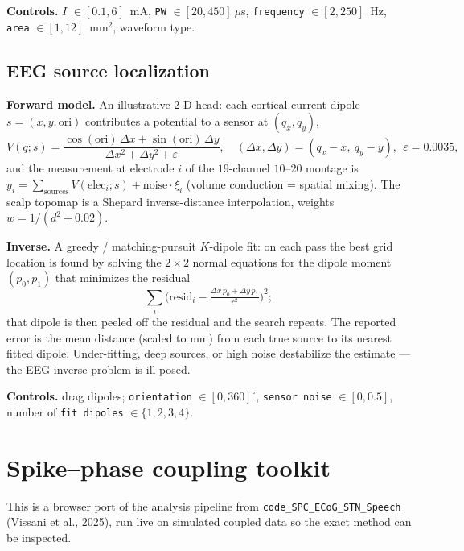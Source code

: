 \documentclass[11pt]{article}
\newcommand{\param}[1]{\textcolor{neonmag}{\texttt{#1}}}
\newcommand{\code}[1]{\texttt{#1}}
\begin{document}
\textbf{Controls.} \param{$I$} $\in[0.1,6]$~mA, \param{PW} $\in[20,450]~\mu$s,
\param{frequency} $\in[2,250]$~Hz, \param{area} $\in[1,12]$~mm$^2$, waveform type.

\subsection{EEG source localization}

\textbf{Forward model.} An illustrative 2-D head: each cortical current dipole
$s=(x,y,\text{ori})$ contributes a potential to a sensor at $(q_x,q_y)$,
\[
V(q; s) = \frac{\cos(\text{ori})\,\Delta x + \sin(\text{ori})\,\Delta y}{\Delta x^2 + \Delta y^2 + \varepsilon},
\quad (\Delta x,\Delta y) = (q_x - x,\ q_y - y),\ \ \varepsilon = 0.0035,
\]
and the measurement at electrode $i$ of the $19$-channel $10$--$20$ montage is
$y_i = \sum_{\text{sources}} V(\text{elec}_i; s) + \text{noise}\cdot\xi_i$ (volume conduction =
spatial mixing). The scalp topomap is a Shepard inverse-distance interpolation, weights
$w = 1/(d^2 + 0.02)$.

\textbf{Inverse.} A greedy / matching-pursuit $K$-dipole fit: on each pass the best grid location
is found by solving the $2\times2$ normal equations for the dipole moment $(p_0,p_1)$ that
minimizes the residual
\[
\sum_i\Big(\text{resid}_i - \tfrac{\Delta x\,p_0 + \Delta y\,p_1}{r^2}\Big)^2;
\]
that dipole is then peeled off the residual and the search repeats. The reported error is the
mean distance (scaled to mm) from each true source to its nearest fitted dipole. Under-fitting,
deep sources, or high noise destabilize the estimate --- the EEG inverse problem is ill-posed.

\textbf{Controls.} drag dipoles; \param{orientation} $\in[0,360]^\circ$,
\param{sensor noise} $\in[0,0.5]$, number of \param{fit dipoles} $\in\{1,2,3,4\}$.

\section{Spike--phase coupling toolkit}

This is a browser port of the analysis pipeline from
\href{https://github.com/Brain-Modulation-Lab/code_SPC_ECoG_STN_Speech}{\code{code\_SPC\_ECoG\_STN\_Speech}}
(Vissani et al., 2025), run live on simulated coupled data so the exact method can be inspected.
\end{document}
